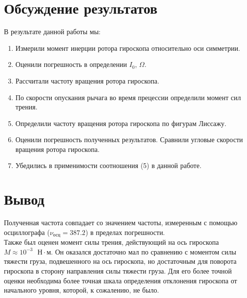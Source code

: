\documentclass[a4paper,12pt]{article}
\begin{document}
	\section{Обсуждение результатов}
    В результате данной работы мы:
    \begin{enumerate}
        \item Измерили момент инерции ротора гироскопа относительно оси симметрии.
        \item Оценили погрешность в определении $I_0$, $\Omega$.
        \item Рассчитали частоту вращения ротора гироскопа.
        \item По скорости опускания рычага во время прецессии определили момент сил трения.
        \item Определили частоту вращения ротора гироскопа по фигурам Лиссажу.
        \item Оценили погрешность полученных результатов. Сравнили угловые скорости вращения
        ротора гироскопа.
        \item Убедились в применимости соотношения (5) в данной работе.
    \end{enumerate}

    \section{Вывод}
    Полученная частота совпадает со значением частоты, измеренным с помощью осциллографа ($ \nu_\text{осц} = 387.2$) в пределах погрешности.\\
    Также был оценен момент силы трения, действующий на ось гироскопа $ M \approx 10^{-3} \text{ } \text{Н} \cdot \text{м} $. Он оказался достаточно мал по сравнению с моментом силы тяжести груза, подвешенного на ось гироскопа, но достаточным для поворота гироскопа в сторону направления силы тяжести груза. Для его более точной оценки необходима более точная шкала определения отклонения гироскопа от начального уровня, которой, к сожалению, не было.
\end{document}
